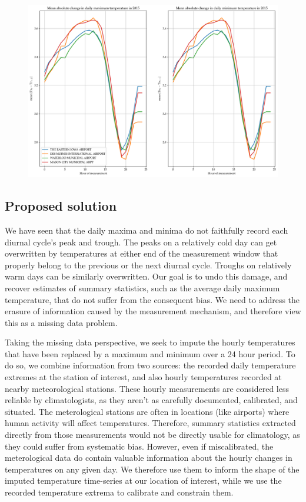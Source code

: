 \documentclass[letter]{article}
\makeatletter
\def\maxwidth{\ifdim\Gin@nat@width>\linewidth\linewidth
\else\Gin@nat@width\fi}
\let\Oldincludegraphics\includegraphics
\renewcommand{\includegraphics}[1]{\Oldincludegraphics[width=.8\maxwidth]{#1}}
\makeatother
\begin{document}
\begin{figure}
\centering
\includegraphics{figures/waterloo_meanabsdiff.png}
\caption{\label{fig:waterloo_meanabsdiff}}
\end{figure}
    


        \subsection{Proposed solution}\label{proposed-solution}

We have seen that the daily maxima and minima do not faithfully record each diurnal cycle's peak and trough.
The peaks on a relatively cold day can get overwritten by temperatures at either end of the measurement window that properly belong to the previous or the next diurnal cycle.
Troughs on relatively warm days can be similarly overwritten.
Our goal is to undo this damage, and recover estimates of summary statistics, such as the average daily maximum temperature, that do not suffer from the consequent bias.
We need to address the erasure of information caused by the measurement mechanism, and therefore view this as a missing data problem.

Taking the missing data perspective, we seek to impute the hourly temperatures that have been replaced by a maximum and minimum over a 24 hour period.
To do so, we combine information from two sources: the recorded daily temperature extremes at the station of interest, and also hourly temperatures recorded at nearby meteorological stations.
These hourly measurements are considered less reliable by climatologists, as they aren't as carefully documented, calibrated, and situated.
The meterological stations are often in locations (like airports) where human activity will affect temperatures.
Therefore, summary statistics extracted directly from those measurements would not be directly usable for climatology, as they could suffer from systematic bias.
However, even if miscalibrated, the meterological data do contain valuable information about the hourly changes in temperatures on any given day.
We therefore use them to inform the shape of the imputed temperature time-series at our location of interest,
while we use the recorded temperature extrema to calibrate and constrain them.
    
\end{document}
